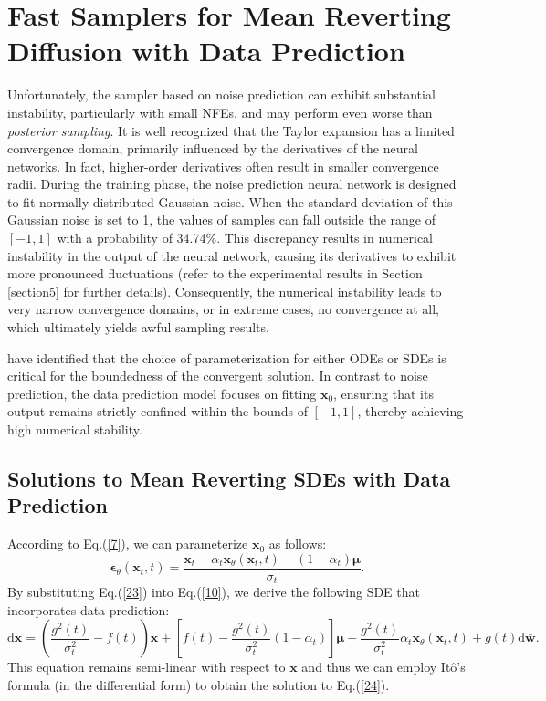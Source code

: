 \section{Fast Samplers for Mean Reverting Diffusion with Data Prediction}
\label{section4}

Unfortunately, the sampler based on noise prediction can exhibit substantial instability, particularly with small NFEs, and may perform even worse than \textit{posterior sampling}. It is well recognized that the Taylor expansion has a limited convergence domain, primarily influenced by the derivatives of the neural networks. In fact, higher-order derivatives often result in smaller convergence radii. During the training phase, the noise prediction neural network is designed to fit normally distributed Gaussian noise. When the standard deviation of this Gaussian noise is set to 1, the values of samples can fall outside the range of $[-1,1]$ with a probability of 34.74\%. This discrepancy results in numerical instability in the output of the neural network, causing its derivatives to exhibit more pronounced fluctuations (refer to the experimental results in Section \ref{section5} for further details). Consequently, the numerical instability leads to very narrow convergence domains, or in extreme cases, no convergence at all, which ultimately yields awful sampling results.

\cite{lu2022dpmsolverplus} have identified that the choice of parameterization for either ODEs or SDEs is critical for the boundedness of the convergent solution. In contrast to noise prediction, the data prediction model \citep{salimans2022progressive} focuses on fitting $\boldsymbol{x}_0$, ensuring that its output remains strictly confined within the bounds of $[-1,1]$, thereby achieving high numerical stability.

\subsection{Solutions to Mean Reverting SDEs with Data Prediction}

According to Eq.(\ref{7}), we can parameterize $\boldsymbol{x}_0$ as follows:
\begin{equation}
\boldsymbol{\epsilon}_\theta(\boldsymbol{x}_t,t)=\frac{\boldsymbol{x}_t-\alpha_t\boldsymbol{x}_\theta(\boldsymbol{x}_t,t)-(1-\alpha_t)\boldsymbol\mu}{\sigma_t}.
\label{23}
\end{equation}
By substituting Eq.(\ref{23}) into Eq.(\ref{10}), we derive the following SDE that incorporates data prediction:
\begin{equation}
\mathrm{d}\boldsymbol{x}=\left(\frac{g^2(t)}{\sigma_t^2}-f(t)\right)\boldsymbol{x}
+\left[f(t)-\frac{g^2(t)}{\sigma_t^2}(1-\alpha_t)\right]\boldsymbol\mu
-\frac{g^2(t)}{\sigma_t^2}\alpha_t\boldsymbol{x}_\theta(\boldsymbol{x}_t,t)
+g(t)\mathrm{d}\bar{\boldsymbol{w}}.
\label{24}
\end{equation}
This equation remains semi-linear with respect to $\boldsymbol{x}$ and thus we can employ Itô's formula (in the differential form) to obtain the solution to Eq.(\ref{24}).

